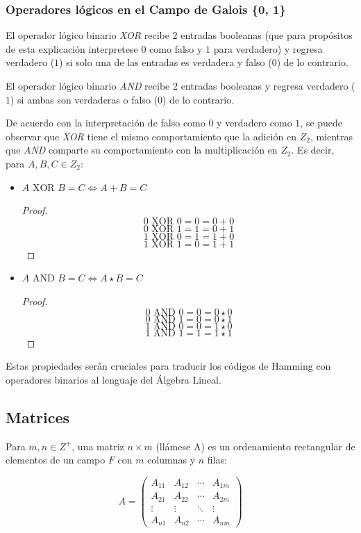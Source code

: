 \documentclass{article}
\begin{document}
\subsubsection{Operadores lógicos en el Campo de Galois \{0, 1\}}

El operador lógico binario \textit{XOR} recibe 2 entradas booleanas (que para propósitos de esta explicación interpretese $0$ como falso y $1$ para verdadero) y regresa verdadero ($1$) si solo una de las entradas es verdadera y falso ($0$) de lo contrario.

El operador lógico binario \textit{AND} recibe 2 entradas booleanas y regresa verdadero ($1$) si ambas son verdaderas o falso ($0$) de lo contrario.

De acuerdo con la interpretación de falso como $0$ y verdadero como $1$, se puede observar que \textit{XOR} tiene el mismo comportamiento que la adición en $Z_2$, mientras que \textit{AND} comparte su comportamiento con la multiplicación en $Z_2$. Es decir, para $A, B, C \in Z_2$:

\begin{itemize}
    \item $A \text{ XOR } B = C \iff A + B = C$
    \begin{proof}
        $$0 \text{ XOR } 0 = 0 = 0 + 0$$
        $$0 \text{ XOR } 1 = 1 = 0 + 1$$
        $$1 \text{ XOR } 0 = 1 = 1 + 0$$
        $$1 \text{ XOR } 1 = 0 = 1 + 1$$
    \end{proof}
    \item $A \text{ AND } B = C \iff A \star B = C$
    \begin{proof}
        $$0 \text{ AND } 0 = 0 = 0 \star 0$$
        $$0 \text{ AND } 1 = 0 = 0 \star 1$$
        $$1 \text{ AND } 0 = 0 = 1 \star 0$$
        $$1 \text{ AND } 1 = 1 = 1 \star 1$$
    \end{proof}
\end{itemize}

Estas propiedades serán cruciales para traducir los códigos de Hamming con operadores binarios al lenguaje del Álgebra Lineal. 

\subsection{Matrices}

Para $m, n \in Z^+$, una matriz $n \times m$ (llámese A) es un ordenamiento rectangular de elementos de un campo $F$ con $m$ columnas y $n$ filas:

$$
A = \begin{pmatrix}
    A_{11} & A_{12} & \cdots & A_{1m} \\
    A_{21} & A_{22} & \cdots & A_{2m} \\
    \vdots & \vdots & \ddots & \vdots \\
    A_{n1} & A_{n2} & \cdots & A_{nm}
\end{pmatrix}
$$
\end{document}
